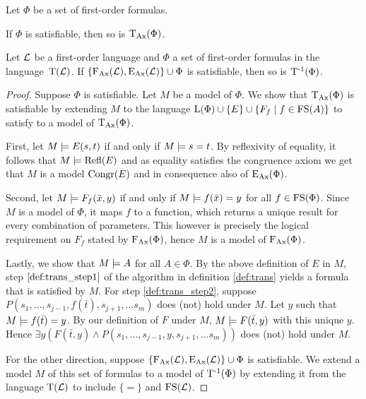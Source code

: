 \begin{prop}
	\label{prop:trans_sat_equiv}
	Let $\Phi$ be a set of first-order formulas.
	\begin{compactenum}
		\item If $\Phi$ is satisfiable, then so is $\operatorname{\operatorname{T}_{Ax}}(\Phi)$.
		\item Let $\operatorname{\mathcal{L}}$ be a first-order language and $\Phi$ a set of first-order formulas in the language~$\operatorname{T}(\operatorname{\mathcal{L}})$.
			If $\{\operatorname{F_{Ax}}(\operatorname{\mathcal{L}}), \operatorname{E_{Ax}}(\operatorname{\mathcal{L}})\} \cup \Phi $ is satisfiable, then so is $\operatorname{T^{-1}}(\Phi)$.
	\end{compactenum}
\end{prop}
\begin{proof}
	Suppose $\Phi$ is satisfiable.
	Let $M$ be a model of $\Phi$.
	We show that $\operatorname{\operatorname{T}_{Ax}}(\Phi)$ is satisfiable by extending $M$ to the language $\operatorname{L}(\Phi)\cup\{E\}\cup\{F_f\mid f \in \operatorname{FS}(A)\}$ to satisfy to a model of $\operatorname{\operatorname{T}_{Ax}}(\Phi)$.

	First, let $M \models E(s, t)$ if and only if $M \models s = t$.
	By reflexivity of equality, it follows that $M \models \operatorname{Refl}(E)$ and
	as equality satisfies the congruence axiom we get that $M$ is a model $\operatorname{Congr}(E)$ and in consequence also of $\operatorname{E_{Ax}}(\Phi)$.

	Second, let $M \models F_f(\bar x, y)$ if and only if $M \models f(\bar x) = y$ for all $f \in \operatorname{FS}(\Phi)$. 
	Since $M$ is a model of $\Phi$, it maps $f$ to a function, which returns a unique result for every combination of parameters.
	This however is precisely the logical requirement on $F_f$ stated by $\operatorname{F_{Ax}}(\Phi)$,   
	hence $M$ is a model of $\operatorname{F_{Ax}}(\Phi)$.

	Lastly, we show that $M \models A$ for all $A \in \Phi$.
	By the above definition of $E$ in $M$, step $\ref{def:trans_step1}$ of the algorithm in definition \ref{def:trans} yields a formula that is satisfied by $M$.
	For step \ref{def:trans_step2}, suppose $P(s_1, \ldots, s_{j-1}, f(\bar t),\allowbreak s_{j+1}, \ldots s_m)$ does (not) hold under $M$.
	Let $y$ such that $M \models f(\bar t)=y$.
	By our definition of $F$ under $M$, $M\models F(\bar t, y)$ with this unique $y$.
	Hence $\exists y (F(\bar t, y) \land P(s_1, \ldots, s_{j-1}, y, \allowbreak s_{j+1}, \ldots s_m))$ does (not) hold under $M$.


	For the other direction, suppose $\{\operatorname{F_{Ax}}(\operatorname{\mathcal{L}}), \operatorname{E_{Ax}}(\operatorname{\mathcal{L}})\} \cup \Phi$ is satisfiable.
	We extend a model $M$ of this set of formulas to a model of $\operatorname{T^{-1}}(\Phi)$ by extending it from the language $\operatorname{T}(\operatorname{\mathcal{L}})$ to include $\{=\}$ and $\operatorname{FS}(\operatorname{\mathcal{L}})$.


\end{proof}
